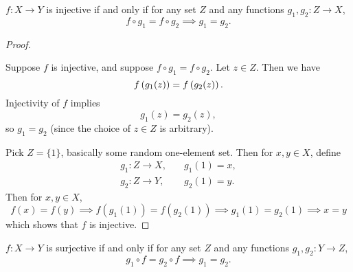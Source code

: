 \begin{proposition}
$f\colon X\to Y$ is injective if and only if for any set $Z$ and any functions $g_1,g_2\colon Z\to X$,
\[f\circ g_1=f\circ g_2 \implies g_1=g_2.\]
\end{proposition}

\begin{proof} \

\fbox{$\implies$} Suppose $f$ is injective, and suppose $f\circ g_1=f\circ g_2$. Let $z\in Z$. Then we have
\[f\left(g_1(z)\right)=f\left(g_2(z)\right).\]
Injectivity of $f$ implies
\[g_1(z)=g_2(z),\]
so $g_1=g_2$ (since the choice of $z\in Z$ is arbitrary).

\fbox{$\impliedby$} Pick $Z=\{1\}$, basically some random one-element set. Then for $x,y\in X$, define
\begin{align*}
g_1\colon Z\to X,&\quad g_1(1)=x,\\
g_2\colon Z\to Y,&\quad g_2(1)=y.
\end{align*}
Then for $x,y\in X$,
\[ f(x)=f(y) \implies f(g_1(1))=f(g_2(1)) \implies g_1(1)=g_2(1) \implies x=y \]
which shows that $f$ is injective.
\end{proof}

\begin{proposition}
$f\colon X\to Y$ is surjective if and only if for any set $Z$ and any functions $g_1,g_2\colon Y\to Z$,
\[g_1 \circ f=g_2 \circ f \implies g_1=g_2.\]
\end{proposition}

